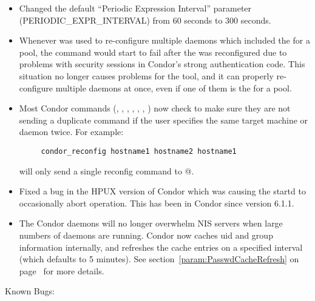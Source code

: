\begin{itemize}
\item Changed the default ``Periodic Expression Interval'' parameter
(PERIODIC\_EXPR\_INTERVAL) from 60 seconds to 300 seconds.

\item Whenever  was used to re-configure multiple
  daemons which included the  for a pool, the
  command would start to fail after the  was
  reconfigured due to problems with security sessions in Condor's
  strong authentication code.
  This situation no longer causes problems for the 
  tool, and it can properly re-configure multiple daemons at once,
  even if one of them is the  for a pool.

\item Most Condor commands (, ,
  , , ,
  , ) now check to make sure
  they are not sending a duplicate command if the user specifies the
  same target machine or daemon twice.  For example:
\begin{verbatim}
     condor_reconfig hostname1 hostname2 hostname1
\end{verbatim}
  will only send a single reconfig command to @.

\item Fixed a bug in the HPUX version of Condor which was causing the
startd to occasionally abort operation.  This has been in Condor since
version 6.1.1.

\item The Condor daemons will no longer overwhelm NIS servers
when large numbers of daemons are running. Condor now caches
uid and group information internally, and refreshes the
cache entries on a specified interval (which defaults to 5
minutes). See section~\ref{param:PasswdCacheRefresh} on
page~\pageref{param:PasswdCacheRefresh} for more details.

\end{itemize}

\noindent Known Bugs:

